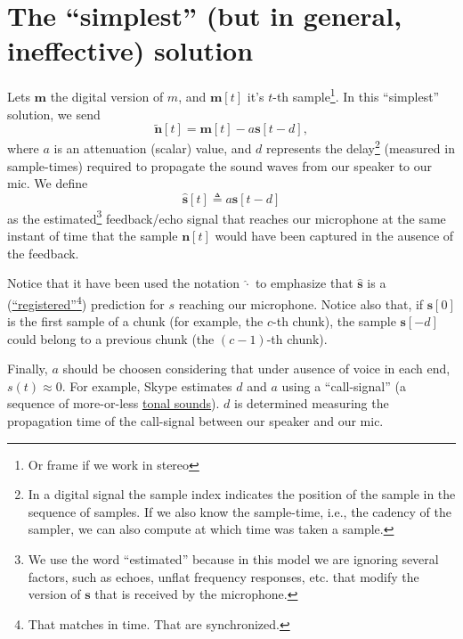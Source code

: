 \section{The ``simplest'' (but in general, ineffective) solution}
Lets ${\mathbf m}$ the digital version of $m$, and ${\mathbf m}[t]$
it's $t$-th sample\footnote{Or frame if we work in stereo}. In this
``simplest'' solution, we send
\begin{equation}
  \tilde{\mathbf n}[t] = {\mathbf m}[t] - a{\mathbf s}[t-d],
  \label{eq:simplest}
\end{equation}
where $a$ is an attenuation (scalar) value, and $d$ represents the
delay\footnote{In a digital signal the sample index indicates the
  position of the sample in the sequence of samples. If we also know
  the sample-time, i.e., the cadency of the sampler, we can also
  compute at which time was taken a sample.} (measured in
sample-times) required to propagate the sound waves from our speaker
to our mic. We define
\begin{equation}
  \hat{\mathbf s}[t] \triangleq a{\mathbf s}[t-d]
  \label{eq:minimal_filter}
\end{equation}
as the estimated\footnote{We use the word ``estimated'' because in
this model we are ignoring several factors, such as echoes, unflat
frequency responses, etc.  that modify the version of $\mathbf{s}$
that is received by the microphone.} feedback/echo signal that reaches our
microphone at the same instant of time that the sample ${\mathbf
  n}[t]$ would have been captured in the ausence of the feedback.

Notice that it have been used the notation $\hat{\cdot}$ to emphasize
that $\hat{\mathbf s}$ is a
(\href{https://en.wikipedia.org/wiki/Image_registration}{``registered''}\footnote{That
matches in time. That are synchronized.}) prediction for $s$ reaching
our microphone. Notice also that, if ${\mathbf s}[0]$ is the first
sample of a chunk (for example, the $c$-th chunk), the sample
${\mathbf s}[-d]$ could belong to a previous chunk (the $(c-1)$-th
chunk).

Finally, $a$ should be choosen considering that under ausence of voice
in each end, $s(t)\approx 0$. For example, Skype estimates $d$ and $a$
using a ``call-signal'' (a sequence of more-or-less
\href{https://en.wikipedia.org/wiki/Musical_tone}{tonal sounds}). $d$
is determined measuring the propagation time of the call-signal
between our speaker and our mic.

